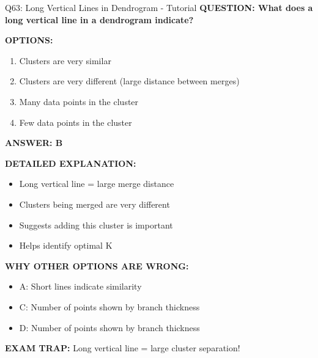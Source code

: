 \documentclass[8pt]{beamer}
\begin{document}
	\begin{frame}{Q63: Long Vertical Lines in Dendrogram - Tutorial}
		\fontsize{6.5}{7.5}\selectfont
		\textbf{QUESTION: What does a long vertical line in a dendrogram indicate?}
		
		\vspace{0.1cm}
		\textbf{OPTIONS:}
		\begin{enumerate}
			\item Clusters are very similar
			\item Clusters are very different (large distance between merges)
			\item Many data points in the cluster
			\item Few data points in the cluster
		\end{enumerate}
		
		\vspace{0.1cm}
		\textcolor{myblue}{\textbf{ANSWER: B}}
		
		\vspace{0.1cm}
		\textbf{DETAILED EXPLANATION:}
		\begin{itemize}
			\item Long vertical line = large merge distance
			\item Clusters being merged are very different
			\item Suggests adding this cluster is important
			\item Helps identify optimal K
		\end{itemize}
		
		\vspace{0.1cm}
		\textcolor{myred}{\textbf{WHY OTHER OPTIONS ARE WRONG:}}
		\begin{itemize}
			\item \textcolor{myred}{A:} Short lines indicate similarity
			\item \textcolor{myred}{C:} Number of points shown by branch thickness
			\item \textcolor{myred}{D:} Number of points shown by branch thickness
		\end{itemize}
		
		\textcolor{myred}{\textbf{EXAM TRAP:}} Long vertical line = \textcolor{myblue}{large cluster separation}!
	\end{frame}
	
\end{document}
